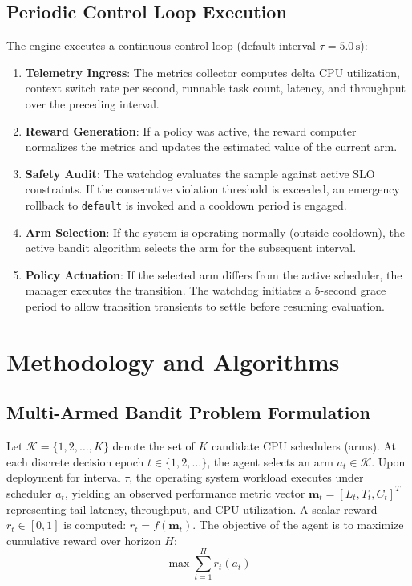 \documentclass[journal]{IEEEtran}
\begin{document}
\subsection{Periodic Control Loop Execution}
The engine executes a continuous control loop (default interval $\tau = 5.0\,\text{s}$):
\begin{enumerate}
    \item \textbf{Telemetry Ingress}: The metrics collector computes delta CPU utilization, context switch rate per second, runnable task count, latency, and throughput over the preceding interval.
    \item \textbf{Reward Generation}: If a policy was active, the reward computer normalizes the metrics and updates the estimated value of the current arm.
    \item \textbf{Safety Audit}: The watchdog evaluates the sample against active SLO constraints. If the consecutive violation threshold is exceeded, an emergency rollback to \texttt{default} is invoked and a cooldown period is engaged.
    \item \textbf{Arm Selection}: If the system is operating normally (outside cooldown), the active bandit algorithm selects the arm for the subsequent interval.
    \item \textbf{Policy Actuation}: If the selected arm differs from the active scheduler, the manager executes the transition. The watchdog initiates a 5-second grace period to allow transition transients to settle before resuming evaluation.
\end{enumerate}

\section{Methodology and Algorithms}
\label{sec:method}

\subsection{Multi-Armed Bandit Problem Formulation}
Let $\mathcal{K} = \{1, 2, \dots, K\}$ denote the set of $K$ candidate CPU schedulers (arms). At each discrete decision epoch $t \in \{1, 2, \dots\}$, the agent selects an arm $a_t \in \mathcal{K}$. Upon deployment for interval $\tau$, the operating system workload executes under scheduler $a_t$, yielding an observed performance metric vector $\mathbf{m}_t = [L_t, T_t, C_t]^T$ representing tail latency, throughput, and CPU utilization. A scalar reward $r_t \in [0, 1]$ is computed: $r_t = f(\mathbf{m}_t)$. The objective of the agent is to maximize cumulative reward over horizon $H$:
\begin{equation}
\max \sum_{t=1}^H r_t(a_t)
\end{equation}
\end{document}
